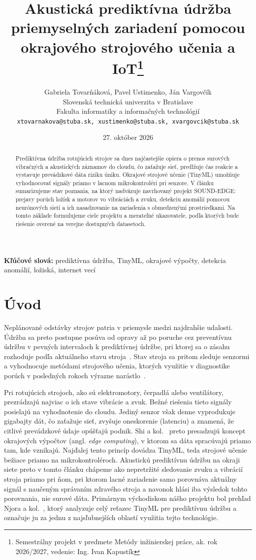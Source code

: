 \documentclass[10pt,twoside,slovak,a4paper]{article}
\title{Akustická prediktívna údržba priemyselných zariadení pomocou okrajového strojového učenia a IoT\thanks{Semestrálny projekt v predmete Metódy inžinierskej práce, ak. rok 2026/2027, vedenie: Ing. Ivan Kapustík}}
\author{Gabriela Tovarňáková, Pavel Ustimenko, Ján Vargovčík\\[2pt]
	{\small Slovenská technická univerzita v Bratislave}\\
	{\small Fakulta informatiky a informačných technológií}\\
	{\small \texttt{xtovarnakova@stuba.sk, xustimenko@stuba.sk, xvargovcik@stuba.sk}} %
	}
\date{\small27. október 2026} %
\begin{document}
\maketitle

\begin{abstract}
Prediktívna údržba rotujúcich strojov sa dnes najčastejšie opiera o prenos surových vibračných a akustických záznamov do cloudu, čo zaťažuje sieť, predlžuje čas reakcie a vystavuje prevádzkové dáta riziku úniku. Okrajové strojové učenie (TinyML) umožňuje vyhodnocovať signály priamo v lacnom mikrokontroléri pri senzore. V článku sumarizujeme stav poznania, na ktorý nadväzuje navrhovaný projekt SOUND-EDGE: prejavy porúch ložísk a motorov vo vibráciách a zvuku, detekciu anomálií pomocou neurónových sietí a ich nasadzovanie na zariadenia s obmedzenými prostriedkami. Na tomto základe formulujeme ciele projektu a merateľné ukazovatele, podľa ktorých bude riešenie overené na verejne dostupných datasetoch.
\end{abstract}

\noindent\textbf{Kľúčové slová:} prediktívna údržba, TinyML, okrajové výpočty, detekcia anomálií, ložiská, internet vecí



\section{Úvod} \label{uvod}

Neplánované odstávky strojov patria v priemysle medzi najdrahšie udalosti. Údržba sa preto postupne posúva od opravy až po poruche cez preventívnu údržbu v pevných intervaloch k prediktívnej údržbe, pri ktorej sa o zásahu rozhoduje podľa aktuálneho stavu stroja~\cite{10781407}. Stav stroja sa pritom sleduje senzormi a vyhodnocuje metódami strojového učenia, ktorých využitie v diagnostike porúch v posledných rokoch výrazne narástlo~\cite{lei2020}.

Pri rotujúcich strojoch, ako sú elektromotory, čerpadlá alebo ventilátory, prezrádzajú najviac o ich stave vibrácie a zvuk. Bežné riešenia tieto signály posielajú na vyhodnotenie do cloudu. Jediný senzor však denne vyprodukuje gigabajty dát, čo zaťažuje sieť, zvyšuje oneskorenie (latenciu) a znamená, že citlivé prevádzkové údaje opúšťajú podnik. Shi a kol.~\cite{shi2016edge} preto presadzujú koncept okrajových výpočtov (angl. \emph{edge computing}), v ktorom sa dáta spracúvajú priamo tam, kde vznikajú. Najďalej tento princíp dovádza TinyML, teda strojové učenie bežiace priamo na mikrokontroléroch. Akustickú prediktívnu údržbu na okraji siete preto v tomto článku chápeme ako nepretržité sledovanie zvuku a vibrácií stroja priamo pri ňom, pri ktorom lacné zariadenie samo porovnáva aktuálny signál s naučeným správaním zdravého stroja a navonok hlási iba výsledok tohto porovnania, nie surové dáta. Primárnym východiskom nášho projektu bol prehľad Njora a kol.~\cite{10781407}, ktorý analyzuje celý reťazec TinyML pre prediktívnu údržbu a označuje ju za jednu z najsľubnejších oblastí využitia tejto technológie.
\end{document}
